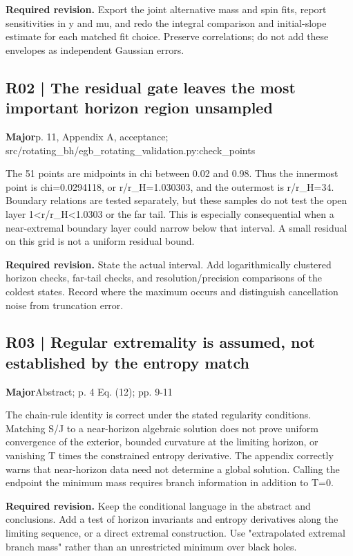 \documentclass[10pt,a4paper]{article}
\begin{document}
\textbf{Required revision.} Export the joint alternative mass and spin fits, report sensitivities in y and mu, and redo the integral comparison and initial-slope estimate for each matched fit choice. Preserve correlations; do not add these envelopes as independent Gaussian errors.

\subsection*{R02 | The residual gate leaves the most important horizon region unsampled}
\textbf{Major}\quad p. 11, Appendix A, acceptance; src/rotating\_bh/egb\_rotating\_validation.py:check\_points

The 51 points are midpoints in chi between 0.02 and 0.98. Thus the innermost point is chi=0.0294118, or r/r\_H=1.030303, and the outermost is r/r\_H=34. Boundary relations are tested separately, but these samples do not test the open layer 1\textless{}r/r\_H\textless{}1.0303 or the far tail. This is especially consequential when a near-extremal boundary layer could narrow below that interval. A small residual on this grid is not a uniform residual bound.

\textbf{Required revision.} State the actual interval. Add logarithmically clustered horizon checks, far-tail checks, and resolution/precision comparisons of the coldest states. Record where the maximum occurs and distinguish cancellation noise from truncation error.

\subsection*{R03 | Regular extremality is assumed, not established by the entropy match}
\textbf{Major}\quad Abstract; p. 4 Eq. (12); pp. 9-11

The chain-rule identity is correct under the stated regularity conditions. Matching S/J to a near-horizon algebraic solution does not prove uniform convergence of the exterior, bounded curvature at the limiting horizon, or vanishing T times the constrained entropy derivative. The appendix correctly warns that near-horizon data need not determine a global solution. Calling the endpoint the minimum mass requires branch information in addition to T=0.

\textbf{Required revision.} Keep the conditional language in the abstract and conclusions. Add a test of horizon invariants and entropy derivatives along the limiting sequence, or a direct extremal construction. Use "extrapolated extremal branch mass" rather than an unrestricted minimum over black holes.
\end{document}
